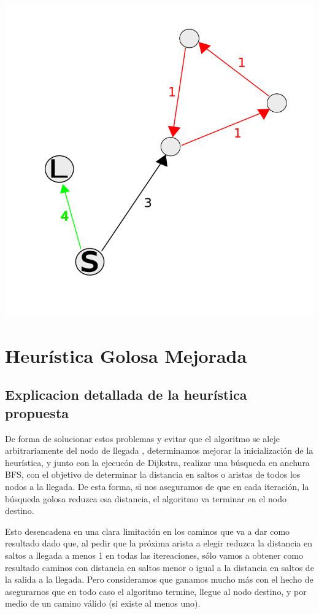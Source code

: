\begin{center}
\includegraphics[scale=0.35]{img/ciclo.png}
\end{center}


\section{Heur\'istica Golosa Mejorada}

\subsection{Explicacion detallada de la heur\'istica propuesta}

De forma de solucionar estos problemas y evitar que el algoritmo se aleje arbitrariamente del nodo de llegada , determinamos mejorar la inicializaci\'on de la heur\'istica, y junto con la ejecuc\'on de Dijkstra, realizar una b\'usqueda en anchura BFS, con el objetivo de determinar la distancia en saltos o aristas de todos los nodos a la llegada. De esta forma, si nos aseguramos de que en cada iteraci\'on, la b\'usqueda golosa reduzca esa distancia, el algoritmo va terminar en el nodo destino.

\vspace{2mm}

Esto desencadena en una clara limitaci\'on en los caminos que va a dar como resultado dado que, al pedir que la pr\'oxima arista a elegir reduzca la distancia en saltos a llegada a menos 1 en todas las itereaciones, s\'olo vamos a obtener como resultado caminos con distancia en saltos menor o igual a la distancia en saltos de la salida a la llegada. Pero consideramos que ganamos mucho m\'as con el hecho de asegurarnos que en todo caso el algoritmo termine, llegue al nodo destino, y por medio de un camino v\'alido (si existe al menos uno).

